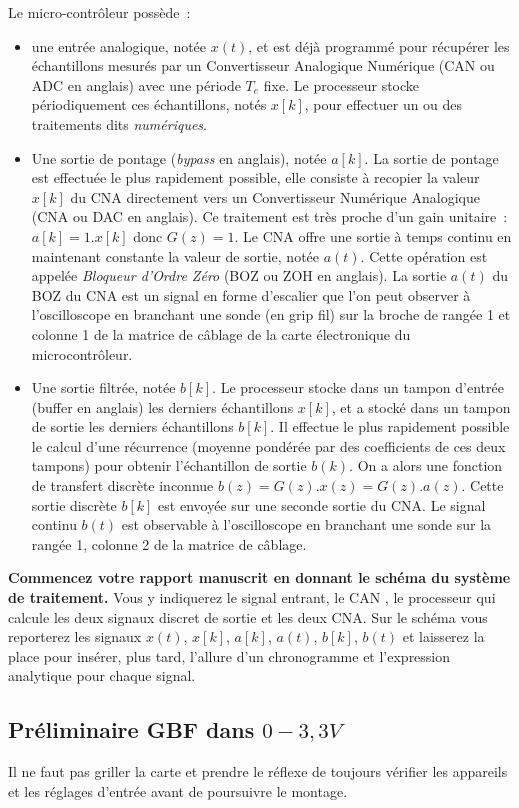 \documentclass[a4paper,twoside,12pt]{report}           %
\begin{document}
Le micro-contrôleur possède~:
\begin{itemize}
\item une entrée analogique, notée $x(t)$, et est déjà programmé pour
  récupérer les échantillons mesurés par un Convertisseur Analogique
  Numérique (CAN ou ADC en anglais) avec une période $T_e$ fixe. Le
  processeur stocke périodiquement ces échantillons, notés $x[k]$,
  pour effectuer un ou des traitements dits \emph{numériques}.
\item Une sortie de pontage (\emph{bypass} en anglais), notée $a[k]$.
  La sortie de pontage est effectuée le plus rapidement possible, elle
  consiste à recopier la valeur $x[k]$ du CNA directement vers un
  Convertisseur Numérique Analogique (CNA ou DAC en anglais). Ce
  traitement est très proche d'un gain unitaire~: $a[k] = 1 . x[k]$
  donc $G(z) = 1$. Le CNA offre une sortie à temps continu en
  maintenant constante la valeur de sortie, notée $a(t)$. Cette
  opération est appelée \emph{Bloqueur d'Ordre Zéro} (BOZ ou ZOH en
  anglais). La sortie $a(t)$ du BOZ du CNA est un signal en forme
  d'escalier que l'on peut observer à l'oscilloscope en branchant une
  sonde (en grip fil) sur la broche de rangée 1 et colonne 1 de la
  matrice de câblage de la carte électronique du microcontrôleur.
\item Une sortie filtrée, notée $b[k]$. Le processeur stocke dans un
  tampon d'entrée (buffer en anglais) les derniers échantillons
  $x[k]$, et a stocké dans un tampon de sortie les derniers
  échantillons $b[k]$. Il effectue le plus rapidement possible le
  calcul d'une récurrence (moyenne pondérée par des coefficients de
  ces deux tampons) pour obtenir l'échantillon de sortie $b(k)$. On a
  alors une fonction de transfert discrète inconnue
  $b(z)=G(z).x(z)=G(z).a(z)$. Cette sortie discrète $b[k]$ est envoyée
  sur une seconde sortie du CNA. Le signal continu $b(t)$ est
  observable à l'oscilloscope en branchant une sonde sur la rangée 1,
  colonne 2 de la matrice de câblage.
\end{itemize}

\textbf{Commencez votre rapport manuscrit en donnant le schéma du
  système de traitement.} Vous y indiquerez le signal entrant, le CAN
, le processeur qui calcule les deux signaux discret de sortie et les
deux CNA. Sur le schéma vous reporterez les signaux $x(t)$, $x[k]$,
$a[k]$, $a(t)$, $b[k]$, $b(t)$ et laisserez la place pour insérer,
plus tard, l'allure d'un chronogramme et l'expression analytique pour
chaque signal.

\subsection{Préliminaire GBF dans $0-3,3V$}
Il ne faut pas griller la carte et prendre le réflexe de toujours
vérifier les appareils et les réglages d'entrée avant de poursuivre le
montage.
\end{document}
